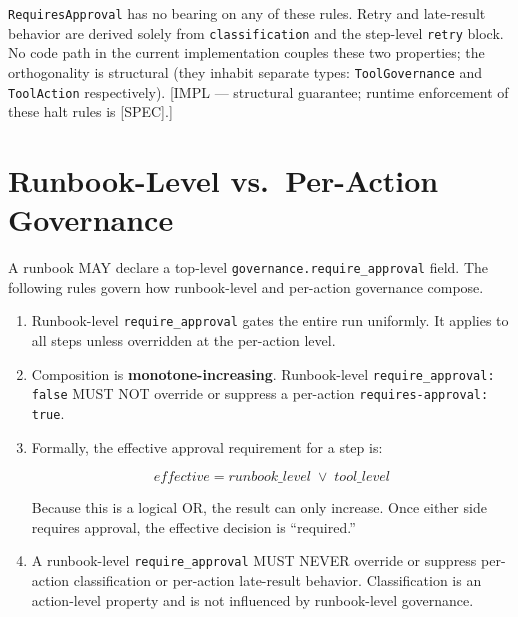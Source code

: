 \noindent \texttt{RequiresApproval} has no bearing on any of these rules.
Retry and late-result behavior are derived solely from \texttt{classification}
and the step-level \texttt{retry} block.  No code path in the current
implementation couples these two properties; the orthogonality is structural
(they inhabit separate types: \texttt{ToolGovernance} and
\texttt{ToolAction} respectively).  [IMPL — structural guarantee; runtime
enforcement of these halt rules is [SPEC].]

\section{Runbook-Level vs.\ Per-Action Governance}
\label{sec:rp-governance-composition}

A runbook MAY declare a top-level \texttt{governance.require\_approval} field.
The following rules govern how runbook-level and per-action governance compose.

\begin{enumerate}
  \item Runbook-level \texttt{require\_approval} gates the entire run
        uniformly.  It applies to all steps unless overridden at the per-action
        level.

  \item Composition is \textbf{monotone-increasing}.  Runbook-level
        \texttt{require\_approval: false} MUST NOT override or suppress a
        per-action \texttt{requires-approval: true}.

  \item Formally, the effective approval requirement for a step is:

        \[
          \textit{effective} = \textit{runbook\_level} \;\lor\;
          \textit{tool\_level}
        \]

        Because this is a logical OR, the result can only increase.  Once
        either side requires approval, the effective decision is ``required.''

  \item A runbook-level \texttt{require\_approval} MUST NEVER override or
        suppress per-action classification or per-action late-result behavior.
        Classification is an action-level property and is not influenced by
        runbook-level governance.
\end{enumerate}

